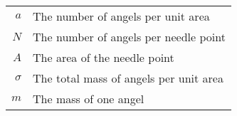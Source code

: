 
\begin{notation}

  \begin{center}
    \begin{tabular}{rl}
      $a$      & The number of angels per unit area     \\
      $N$      & The number of angels per needle point  \\
      $A$      & The area of the needle point           \\
      $\sigma$ & The total mass of angels per unit area \\
      $m$      & The mass of one angel                  \\
    \end{tabular}
  \end{center}

\end{notation}





